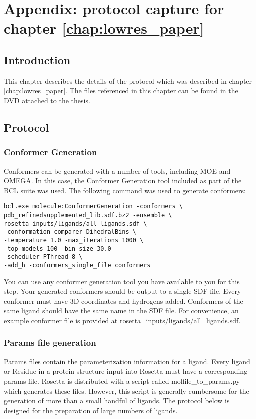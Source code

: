 \chapter{Appendix: protocol capture for chapter \ref{chap:lowres_paper}}
\label{chap:lowres_capture}
\section{Introduction}

This chapter describes the details of the protocol which was described in chapter \ref{chap:lowres_paper}.
The files referenced in this chapter can be found in the DVD attached to the thesis.

\section{Protocol}

\subsection{Conformer Generation}

Conformers can be generated with a number of tools, including MOE and OMEGA.
In this case, the Conformer Generation tool included as part of the \ac{BCL} suite was used.
The following command was used to generate conformers:
\singlespace
\begin{verbatim}
bcl.exe molecule:ConformerGeneration -conformers \
pdb_refinedsupplemented_lib.sdf.bz2 -ensemble \
rosetta_inputs/ligands/all_ligands.sdf \
-conformation_comparer DihedralBins \
-temperature 1.0 -max_iterations 1000 \
-top_models 100 -bin_size 30.0 
-scheduler PThread 8 \
-add_h -conformers_single_file conformers
\end{verbatim}
\doublespace
You can use any conformer generation tool you have available to you for this step.
Your generated conformers should be output to a single \ac{SDF} file.
Every conformer must have 3D coordinates and hydrogens added.
Conformers of the same ligand should have the same name in the \ac{SDF} file.
For convenience, an example conformer file is provided at rosetta\_inputs/ligands/all\_ligands.sdf.

\subsection{Params file generation}

Params files contain the parameterization information for a ligand.
Every  ligand or Residue in a protein structure input into Rosetta must have a corresponding params file.
Rosetta is distributed with a script called molfile\_to\_params.py which generates these files.
However, this script is generally cumbersome for the generation of more than a small handful of ligands.
The protocol below is designed for the preparation of large numbers of ligands.

